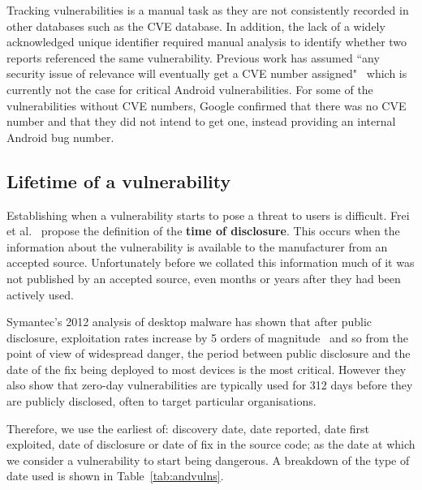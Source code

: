 \documentclass{llncs}
\begin{document}
Tracking vulnerabilities is a manual task as they are not consistently recorded in other databases such as the CVE database.
In addition, the lack of a widely acknowledged unique identifier required manual analysis to identify whether two reports referenced the same vulnerability.
Previous work has assumed ``any security issue of relevance will eventually get a CVE number assigned"~\cite{Frei2010} which is currently not the case for critical Android vulnerabilities.
For some of the vulnerabilities without CVE numbers, Google confirmed that there was no CVE number and that they did not intend to get one, instead providing an internal Android bug number.


\subsection{Lifetime of a vulnerability}

Establishing when a vulnerability starts to pose a threat to users is difficult.
Frei et al.~\cite{Frei2010} propose the definition of the \textbf{time of disclosure}.
This occurs when the information about the vulnerability is available to the manufacturer from an accepted source.
Unfortunately before we collated this information much of it was not published by an accepted source, even months or years after they had been actively used.

Symantec's 2012 analysis of desktop malware has shown that after public disclosure, exploitation rates increase by 5 orders of magnitude~\cite{Bilge2012} and so from the point of view of widespread danger, the period between public disclosure and the date of the fix being deployed to most devices is the most critical.
However they also show that zero-day vulnerabilities are typically used for 312 days before they are publicly disclosed, often to target particular organisations.

Therefore, we use the earliest of: discovery date, date reported, date first exploited, date of disclosure or date of fix in the source code; as the date at which we consider a vulnerability to start being dangerous.
A breakdown of the type of date used is shown in Table~\ref{tab:andvulns}.
\end{document}
